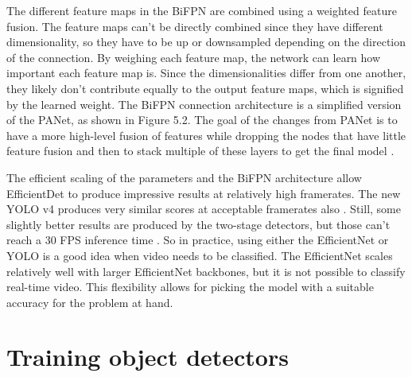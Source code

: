 The different feature maps in the BiFPN are combined using a weighted feature fusion.
The feature maps can't be directly combined since they have different dimensionality, so they have to be up or downsampled depending on the direction of the connection.
By weighing each feature map, the network can learn how important each feature map is.
Since the dimensionalities differ from one another, they likely don't contribute equally to the output feature maps, which is signified by the learned weight.
The BiFPN connection architecture is a simplified version of the PANet, as shown in Figure 5.2.
The goal of the changes from PANet is to have a more high-level fusion of features while dropping the nodes that have little feature fusion and then to stack multiple of these layers to get the final model \citep{efficientDet}.

The efficient scaling of the parameters and the BiFPN architecture allow EfficientDet to produce impressive results at relatively high framerates.
The new YOLO v4 produces very similar scores at acceptable framerates also \citep{yolov4}.
Still, some slightly better results are produced by the two-stage detectors, but those can't reach a 30 FPS inference time \citep{yolov4}.
So in practice, using either the EfficientNet or YOLO is a good idea when video needs to be classified.
The EfficientNet scales relatively well with larger EfficientNet backbones, but it is not possible to classify real-time video.
This flexibility allows for picking the model with a suitable accuracy for the problem at hand.

\section{Training object detectors}